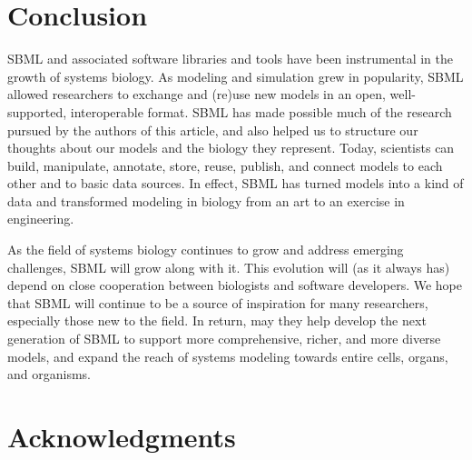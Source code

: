 \documentclass{sbml-paper}
\begin{document}
\section*{Conclusion}

SBML and associated software libraries and tools have been instrumental in the growth of systems biology.  As modeling and simulation grew in popularity, SBML allowed researchers to exchange and (re)use new models in an open, well-supported, interoperable format. SBML has made possible much of the research pursued by the authors of this article, and also helped us to structure our thoughts about our models and the biology they represent.  Today, scientists can build, manipulate, annotate, store, reuse, publish, and connect models to each other and to basic data sources.  In effect, SBML has turned models into a kind of data and transformed modeling in biology from an art to an exercise in engineering.

As the field of systems biology continues to grow and address emerging challenges, SBML will grow along with it.  This evolution will (as it always has) depend on close cooperation between biologists and software developers.  We hope that SBML will continue to be a source of inspiration for many researchers, especially those new to the field.  In return, may they help develop the next generation of SBML to support more comprehensive, richer, and more diverse models, and expand the reach of systems modeling towards entire cells, organs, and organisms.


\section*{Acknowledgments}
\end{document}
